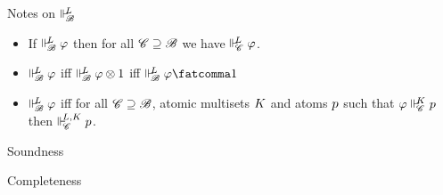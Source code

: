 \documentclass{beamer}
\begin{document}
\begin{frame}{Notes on $\Vdash_{ \!\!\mathscr{B} }^{ \!\!{L} }$}
\begin{itemize}
\item If $\Vdash_{ \!\!\mathscr{B} }^{ \!\!{L} }\varphi$ then for all $\mathscr{C} \supseteq \mathscr{B}$ we have $\Vdash_{ \!\!\mathscr{C} }^{ \!\!{L} }\varphi$.
\vspace{5pt}
\item $\Vdash_{ \!\!\mathscr{B} }^{ \!\!{L} }\varphi$  iff $\Vdash_{ \!\!\mathscr{B} }^{ \!\!{L} }\varphi\otimes1$ iff $\suppM{\baseB}{\at{L}}\varphi\fatcomma\mtop$
\vspace{5pt}
\item $\Vdash_{ \!\!\mathscr{B} }^{ \!\!{L} }\varphi$ iff for all $\mathscr{C} \supseteq \mathscr{B}$, atomic multisets ${K}$ and atoms ${p}$ such that $\varphi \Vdash_{ \!\!\mathscr{C} }^{ \!\!{K} }{p}$ then $\Vdash_{ \!\!\mathscr{C} }^{ \!\!{L},{K} }{p}$. 
\end{itemize}
\end{frame}
\begin{frame}{Soundness}
	
\end{frame}
\begin{frame}{Completeness}
	
\end{frame}
\end{document}
